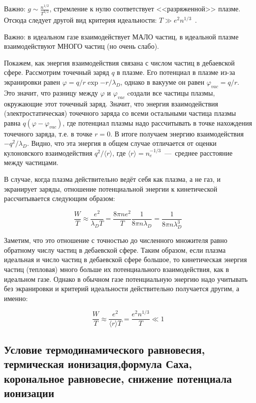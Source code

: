 \documentclass[10pt, a4paper]{article}
\begin{document}
Важно: $g \sim \frac{n^{1/2}}{T^{3/2}}$, стремление к нулю соответствует <<разряженной>> плазме. Отсюда следует другой вид критерия идеальности: $T \gg e^2 n^{1/3}$~\cite{kotelnikov}.

Важно: в идеальном газе взаимодействует МАЛО частиц, в идеальной плазме взаимодействуют МНОГО частиц (но очень слабо).

Покажем, как энергия взаимодействия связана с числом частиц в дебаевской сфере. Рассмотрим точечный заряд $q$ в плазме. Его потенциал в плазме из-за экранировки равен $\varphi = q/r\exp{-r/\lambda_D}$, однако в вакууме он равен $\varphi_{vac}=q/r$. Это значит, что разницу между $\varphi$ и $\varphi_{vac}$ cоздали все частицы плазмы, окружающие этот точечный заряд.
Значит, что энергия взаимодействия (электростатическая) точечного заряда со всеми остальными частица плазмы равна $q (\varphi - \varphi_{vac})$, где потенциал плазмы надо рассчитывать в точке нахождения точечного заряда, т.е. в точке $r=0$. В итоге получаем энергию взаимодействия $-q^2/\lambda_D$.
Видно, что эта энергия в общем случае отличается от оценки кулоновского взаимодействия $q^2/\langle r\rangle$, где $\langle r \rangle = n_e^{-1/3}$~---~среднее расстояние между частицами.

В случае, когда плазма действительно ведёт себя как плазма, а не газ, и экранирует заряды, отношение потенциальной энергии к кинетической рассчитывается следующим образом:

\begin{equation}
	\frac{W}{T} \approx \frac{e^2}{\lambda_D T} = \frac{8\pi n e^2}{T}\frac{1}{8\pi n\lambda_D} = \frac{1}{8\pi n \lambda_D^3}
\end{equation}

Заметим, что это отношение с точностью до численного множителя равно обратному числу частиц в дебаевской сфере. Таким образом, если плазма идеальная и число частиц в дебаевской сфере большое, то кинетическая энергия частиц (тепловая) много больше их потенциального взаимодействия, как в идеальном газе. Однако в обычном газе потенциальную энергию надо учитывать без экранировки и критерий идеальности действительно получается другим, а именно:

\begin{equation}
	\frac{W}{T} \approx \frac{e^2}{\langle r \rangle T} = \frac{e^2 n^{1/3}}{T} \ll 1
\end{equation}

\subsection{Условие термодинамического равновесия, термическая ионизация,\linebreak формула Саха, корональное равновесие, снижение потенциала ионизации}
\end{document}
